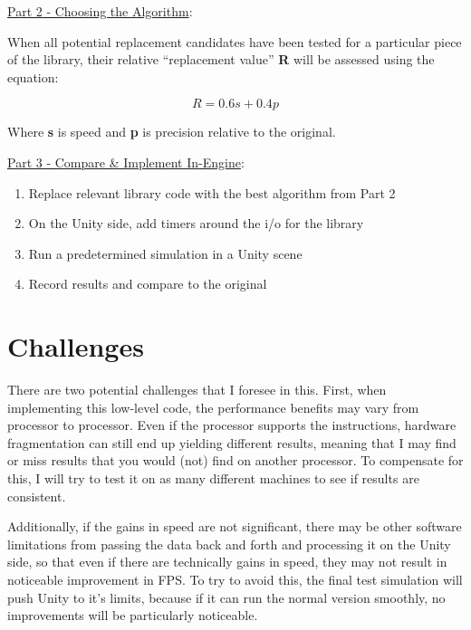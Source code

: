 \documentclass{article}
\begin{document}
\vspace{3mm} %

\noindent \underline{Part 2 - Choosing the Algorithm}:

\vspace{3mm}

When all potential replacement candidates have been tested for a particular piece of the library, their relative “replacement value” \textbf{R} will be assessed using the equation:

\[R=0.6s+0.4p\]
\begin{center}Where \textbf{s} is speed and \textbf{p} is precision relative to the original.\end{center}

\vspace{3mm} %

\noindent \underline{Part 3 - Compare \& Implement In-Engine}:

\begin{enumerate}
\item Replace relevant library code with the best algorithm from Part 2
\item On the Unity side, add timers around the i/o for the library
\item Run a predetermined simulation in a Unity scene
\item Record results and compare to the original
\end{enumerate}

\section{Challenges}

There are two potential challenges that I foresee in this. First, when implementing this low-level code, the performance benefits may vary from processor to processor. Even if the processor supports the instructions, hardware fragmentation can still end up yielding different results, meaning that I may find or miss results that you would (not) find on another processor. To compensate for this, I will try to test it on as many different machines to see if results are consistent.

\vspace{3mm}

Additionally, if the gains in speed are not significant, there may be other software limitations from passing the data back and forth and processing it on the Unity side, so that even if there are technically gains in speed, they may not result in noticeable improvement in FPS. To try to avoid this, the final test simulation will push Unity to it’s limits, because if it can run the normal version smoothly, no improvements will be particularly noticeable.
\end{document}
